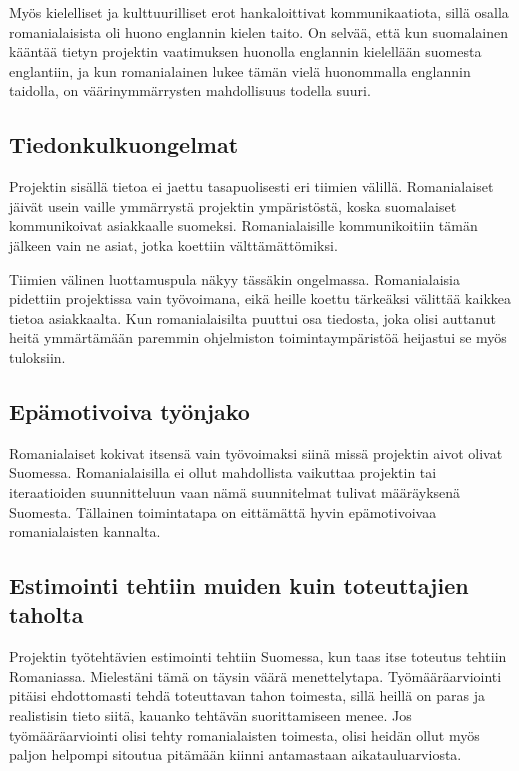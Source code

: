\documentclass[a4paper]{article}
\begin{document}
Myös kielelliset ja kulttuurilliset erot hankaloittivat kommunikaatiota, sillä osalla romanialaisista oli huono englannin kielen taito. On selvää, että kun suomalainen kääntää tietyn projektin vaatimuksen huonolla englannin kielellään suomesta englantiin, ja kun romanialainen lukee tämän vielä huonommalla englannin taidolla, on väärinymmärrysten mahdollisuus todella suuri.

\subsection{Tiedonkulkuongelmat}

Projektin sisällä tietoa ei jaettu tasapuolisesti eri tiimien välillä. Romanialaiset jäivät usein vaille ymmärrystä projektin ympäristöstä, koska suomalaiset kommunikoivat asiakkaalle suomeksi. Romanialaisille kommunikoitiin tämän jälkeen vain ne asiat, jotka koettiin välttämättömiksi.

Tiimien välinen luottamuspula näkyy tässäkin ongelmassa. Romanialaisia pidettiin projektissa vain työvoimana, eikä heille koettu tärkeäksi välittää kaikkea tietoa asiakkaalta. Kun romanialaisilta puuttui osa tiedosta, joka olisi auttanut heitä ymmärtämään paremmin ohjelmiston toimintaympäristöä heijastui se myös tuloksiin. 

\subsection{Epämotivoiva työnjako}

Romanialaiset kokivat itsensä vain työvoimaksi siinä missä projektin aivot olivat Suomessa. Romanialaisilla ei ollut mahdollista vaikuttaa projektin tai iteraatioiden suunnitteluun vaan nämä suunnitelmat tulivat määräyksenä Suomesta. Tällainen toimintatapa on eittämättä hyvin epämotivoivaa romanialaisten kannalta.

\subsection{Estimointi tehtiin muiden kuin toteuttajien taholta}

Projektin työtehtävien estimointi tehtiin Suomessa, kun taas itse toteutus tehtiin Romaniassa. Mielestäni tämä on täysin väärä menettelytapa. Työmääräarviointi pitäisi ehdottomasti tehdä toteuttavan tahon toimesta, sillä heillä on paras ja realistisin tieto siitä, kauanko tehtävän suorittamiseen menee. Jos työmääräarviointi olisi tehty romanialaisten toimesta, olisi heidän ollut myös paljon helpompi sitoutua pitämään kiinni antamastaan aikatauluarviosta.
\end{document}
